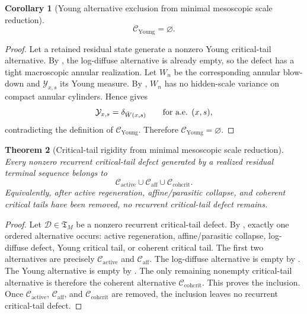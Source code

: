 \documentclass[11pt]{amsart}
\numberwithin{equation}{section}
\theoremstyle{plain}
\newtheorem{theorem}{Theorem}[section]
\newtheorem{corollary}[theorem]{Corollary}
\theoremstyle{definition}
\theoremstyle{remark}
\newcommand{\Cactive}{\mathcal C_{\mathrm{active}}}
\newcommand{\Caff}{\mathcal C_{\mathrm{aff}}}
\newcommand{\Ccohcrit}{\mathcal C_{\mathrm{cohcrit}}}
\newcommand{\Tcrit}{\mathfrak T_M}
\newcommand{\Cyoung}{\mathcal C_{\mathrm{Young}}}
\begin{document}
\begin{corollary}[Young alternative exclusion from minimal mesoscopic scale reduction]
\label{cor:young-branch-discharge}
\[
   \Cyoung=\varnothing .
\]
\end{corollary}

\begin{proof}
Let a retained residual state generate a nonzero Young critical-tail alternative.
By , the log-diffuse alternative is already
empty, so the defect has a tight macroscopic annular realization.  Let \(W_n\)
be the corresponding annular blow-down and \(\mathcal Y_{x,s}\) its Young
measure.  By
,
\(W_n\) has
no hidden-scale variance on compact annular cylinders.  Hence
 gives
\[
   \mathcal Y_{x,s}=\delta_{\bar W(x,s)}
   \qquad\hbox{for a.e. }(x,s),
\]
contradicting the definition of \(\Cyoung\).  Therefore
\(\Cyoung=\varnothing\).
\end{proof}

\begin{theorem}[Critical-tail rigidity from minimal mesoscopic scale reduction]
\label{thm:remaining-rigidity-exact-form}
Every nonzero recurrent critical-tail defect generated by a realized residual
terminal sequence belongs to
\[
   \Cactive\cup\Caff\cup\Ccohcrit .
\]
Equivalently, after active regeneration, affine/parasitic collapse, and
coherent critical tails have been removed, no recurrent critical-tail defect
remains.
\end{theorem}

\begin{proof}
Let \(\mathcal D\in\Tcrit\) be a nonzero recurrent critical-tail defect.  By
, exactly one ordered alternative
occurs: active regeneration, affine/parasitic collapse, log-diffuse defect,
Young critical tail, or coherent critical tail.  The first two alternatives are
precisely \(\Cactive\) and \(\Caff\).  The log-diffuse alternative is empty by
.  The Young alternative is empty by
.  The only remaining nonempty critical-tail
alternative is therefore the coherent alternative \(\Ccohcrit\).  This proves the
inclusion.  Once \(\Cactive\), \(\Caff\), and \(\Ccohcrit\) are removed, the
inclusion leaves no recurrent critical-tail defect.
\end{proof}
\end{document}
